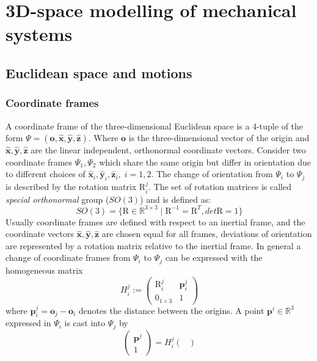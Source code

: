 \documentclass[a4paper,twoside, openright,12pt]{report}
\newcommand{\f}[1]{\boldsymbol{#1}}
\newcommand{\g}[1]{\text{#1}}
\begin{document}
{\section{3D-space modelling of mechanical systems}\label{S:3Dspace-modelling}


\subsection{Euclidean space and motions}\label{[SS:euclideanspacemotions]}
\subsubsection{Coordinate frames}
A coordinate frame of the three-dimensional Euclidean space is a 4-tuple of the form $ \Psi = (\f{o},\hat{\f{x}},\hat{\f{y}},\hat{\f{z}})$. Where $ \f{o} $ is the three-dimensional vector of the origin and $ \hat{\f{x}},\hat{\f{y}},\hat{\f{z}} $ are the linear independent, orthonormal coordinate vectors. Consider two coordinate frames $ {\Psi}_1,{\Psi}_2 $ which share the same origin but differ in orientation due to different choices of $ \hat{\f{x}}_i,\hat{\f{y}}_i,\hat{\f{z}}_i, \; i=1,2 $. The change of orientation from $ {\Psi}_i $ to $ {\Psi}_j $ is described by the rotation matrix $ \g{R}_i^j $. The set of rotation matrices is called \emph{special orthonormal} group ($SO(3)$) \cite{Stramigioli_01b} and is defined as:
\begin{equation}
	SO(3) = \{\g{R} \in \mathbb{R}^{3 \times 3} \; | \; \g{R}^{-1} = \g{R}^T, det \g{R} = 1\}
\end{equation}
Usually coordinate frames are defined with respect to an inertial frame, and the coordinate vectors $ \hat{\f{x}},\hat{\f{y}},\hat{\f{z}} $ are chosen equal for all frames, deviations of orientation are represented by a rotation matrix relative to the inertial frame. In general a change of coordinate frames from $ \Psi_i $ to $ \Psi_j $ can be expressed with the homogeneous matrix
\[ H_i^j := \begin{pmatrix}\g{R}_i^j & \f{p}_i^j \\ 0_{1\times3} & 1\end{pmatrix} \]
where $\f{p}_i^j = \f{o}_j - \f{o}_i$ denotes the distance between the origins. A point $ \f{p}^i \in \mathbb{R}^3 $ expressed in $ {\Psi}_i $ is cast into ${\Psi}_j$ by
\begin{equation}\label{EQ:coordchange}
	\begin{pmatrix}\f{p}^j \\ 1\end{pmatrix} = H_i^j \begin{pmatrix}

\end{pmatrix}
\end{equation}}
\end{document}
